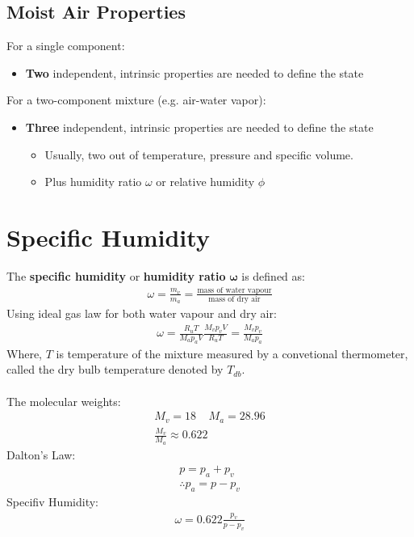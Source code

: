 \documentclass[class=report, crop=false, 12pt,a4paper]{standalone}
\numberwithin{equation}{section}
\begin{document}
\subsection{Moist Air Properties}
For a single component:
\begin{itemize}[noitemsep]
  \item \textbf{Two} independent, intrinsic properties are needed to define the state
\end{itemize}
For a two-component mixture (e.g. air-water vapor):
\begin{itemize}[noitemsep]
  \item \textbf{Three} independent, intrinsic properties are needed to define the state
  \begin{itemize}[noitemsep]
    \item Usually, two out of temperature, pressure
    and specific volume.
    \item Plus humidity ratio $\omega$ or relative humidity $\phi$ 
  \end{itemize}
\end{itemize}
\section{Specific Humidity}
The \textbf{specific humidity} or \textbf{humidity ratio} $\mathbf{\omega}$ is defined as:
\begin{gather}
  \omega = \frac{m_v}{m_a} = \frac{\text{mass of water vapour}}{\text{mass of dry air}}
\end{gather}
Using ideal gas law for both water vapour and dry air:
\begin{gather}
  \omega = \frac{R_u T}{M_a p_a V}\frac{M_v p_v V}{R_u T} = \frac{M_v p_v}{M_a p_a}
\end{gather}
Where, $T$ is temperature of the mixture measured by a convetional thermometer, called the dry bulb temperature denoted by $T_{db}$. \\\\
The molecular weights:
\begin{gather}
  M_v = 18 \ \ \ \ \ M_a = 28.96 \\[5pt]
  \frac{M_v}{M_a} \approx 0.622
\end{gather}
Dalton’s Law:
\begin{gather}
  p = p_a + p_v \\[5pt]
  \therefore p_a = p - p_v
\end{gather}
Specifiv Humidity:
\begin{gather}
  \omega = 0.622\frac{p_v}{p-p_v}
\end{gather}
\end{document}
